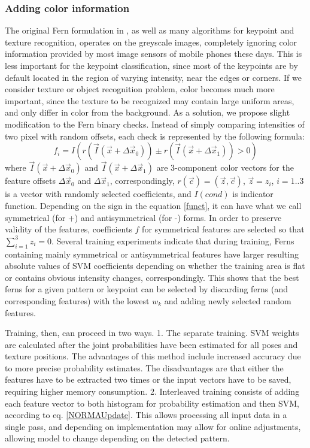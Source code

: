 \subsubsection{Adding color information}
The original Fern formulation in \cite{Ferns1}, as well as many algorithms for keypoint and texture recognition, operates on the greyscale images, completely ignoring color information provided by most image sensors of mobile phones these days. This is less important for the keypoint classification, since most of the keypoints are by default located in the region of varying intensity, near the edges or corners. If we consider texture or object recognition problem, color becomes much more important, since the texture to be recognized may contain large uniform areas, and only differ in color from the background.  As a solution, we propose slight modification to the Fern binary checks. Instead of simply comparing intensities of two pixel with random offsets, each check is represented by the following formula:
\begin{equation}
\label{funct}
f_i=I(r(\vec{I}(\vec{x}+\Delta \vec{x}_0))\pm r(\vec{I}(\vec{x}+\Delta \vec{x}_1))>0)
\end{equation}
where $\vec{I}(\vec{x}+\Delta \vec{x}_0)$ and $\vec{I}(\vec{x}+\Delta \vec{x}_1)$ are 3-component color vectors for the feature offsets $\Delta \vec{x}_0$ and $\Delta \vec{x}_1$, correspondingly, $r(\vec{c})=(\vec{z},\vec{c})$, $\vec{z}={z_i}$, $i=1..3$ is a vector with randomly selected coefficients, and $I(cond)$ is indicator function. Depending on the sign in the equation \ref{funct}, it can have what we call symmetrical (for +) and antisymmetrical (for -) forms. In order to preserve validity of the features, coefficients $f$ for symmetrical features are selected so that $\sum_{i=1}^{3} {z_i}=0$. Several training experiments indicate that during training, Ferns containing mainly symmetrical or antisymmetrical features have larger resulting absolute values of SVM coefficients depending on whether the training area is flat or contains obvious intensity changes, correspondingly. This shows that the best ferns for a given pattern or keypoint can be selected by discarding ferns (and corresponding features) with the lowest $w_k$ and adding newly selected random features.

Training, then, can proceed in two ways. 1. The separate training. SVM weights are calculated after the joint probabilities have been estimated for all poses and texture positions. The advantages of this method include increased accuracy due to more precise probability estimates. The disadvantages are that either the features have to be extracted two times or the input vectors have to be saved, requiring higher memory consumption. 2. Interleaved training consists of adding each feature vector to both histogram for probability estimation and then SVM, according to eq. \ref{NORMAUpdate}. This allows processing all input data in a single pass, and depending on implementation may allow for online adjustments, allowing model to change depending on the detected pattern. 


